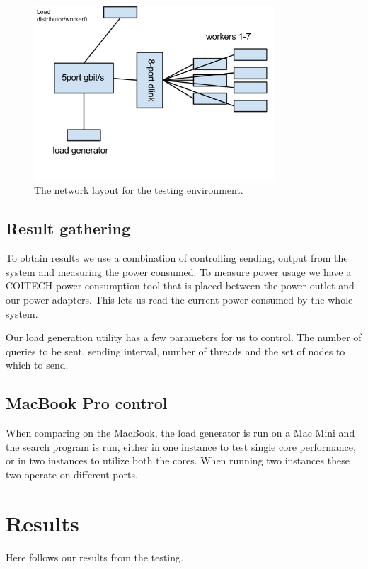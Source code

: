 \begin{figure}[h]
    \centering
    \includegraphics[width=0.8\textwidth]{experiments/networklayout}
    \caption{The network layout for the testing environment.}
    \label{fig:network}
\end{figure}


\subsection{Result gathering}
To obtain results we use a combination of controlling sending, output from the system and measuring the power consumed. To measure power usage we have a COITECH power consumption tool that is placed between the power outlet and our power adapters.
This lets us read the current power consumed by the whole system.

Our load generation utility has a few parameters for us to control. The number of queries to be sent, sending interval, number of threads and the set of nodes to which to send.

\subsection{MacBook Pro control}
When comparing on the MacBook, the load generator is run on a Mac Mini and the search program is run, either in one instance to test single core performance, or in two instances to utilize both the cores.
When running two instances these two operate on different ports.

\clearpage
\section{Results}
\label{sec:experiments}

Here follows our results from the testing.

